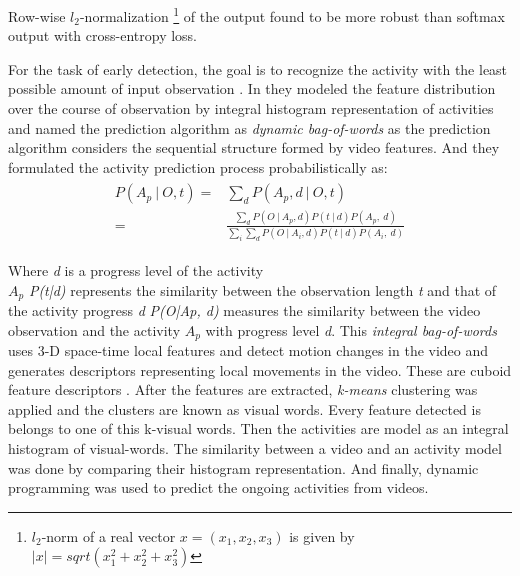 \newpara Row-wise $\textit{l}_2$-normalization \footnote{$l_2$-norm of a real vector $x=(x_1,x_2,x_3)$ is given by $|x|=sqrt(x_1^2+x_2^2+x_3^2)$} of the output found to be more robust than softmax output with cross-entropy loss. %

For the task of early detection, the goal is to recognize the activity with the least possible amount of input observation \cite{ryoo2011human}. In \cite{ryoo2011human} they modeled the feature distribution over the course of observation by integral histogram representation of activities and named the prediction algorithm as \textit{dynamic bag-of-words} as the prediction algorithm considers the sequential structure formed by video features. And they formulated the activity prediction process probabilistically as:
\begin{align}
\begin{split}
		P(A_{p}\: |\: O,t) ={}& \displaystyle \sum_{d}  P(A_{p},d\: |\: O,t)\\
		={}&	\frac{\sum_{d} P(O\: | \: A_{p},d)P(t\: | \:d)P(A_{p},\: d)}
	 {\sum_{i}\sum_{d} P(O\: | \: A_{i},d)P(t\: | \:d)P(A_{i},\: d) }
\end{split}
\end{align}

\newpara Where \textit{d} is a progress level of the activity \\
\textit{$A_{p}$}  \textit{ P(t|d)} represents the similarity between the observation length \textit{t} and that of the activity progress \textit{d}
\textit{P(O|Ap, d)} measures the similarity between the video observation and the activity \textit{$A_{p}$} with progress level \textit{d}. This \textit{integral bag-of-words} uses 3-D space-time local features and detect motion changes in the video and generates descriptors representing local movements in the video. These are cuboid feature descriptors \cite{dollar2005behavior}. After the features are extracted, \textit{k-means} clustering was applied and the clusters are known as visual words. Every feature detected is belongs to one of this k-visual words. Then the activities are model as an integral histogram of visual-words. The similarity between a video and an activity model was done by comparing their histogram representation. And finally, dynamic programming was used to predict the ongoing activities from videos.

